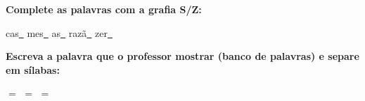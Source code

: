 \noindent\textbf{Complete as palavras com a grafia S/Z:}
\begin{center}
  cas\underline{~} \quad mes\underline{~} \quad as\underline{~} \quad razã\underline{~} \quad zer\underline{~}
\end{center}

\noindent\textbf{Escreva a palavra que o professor mostrar (banco de palavras) e separe em sílabas:}

\begin{center}
  \underline{\hspace{2cm}} $=$ \underline{\hspace{2cm}} \quad \underline{\hspace{2cm}} $=$ \underline{\hspace{2cm}} \quad \underline{\hspace{2cm}} $=$ \underline{\hspace{2cm}}
  \end{center}




